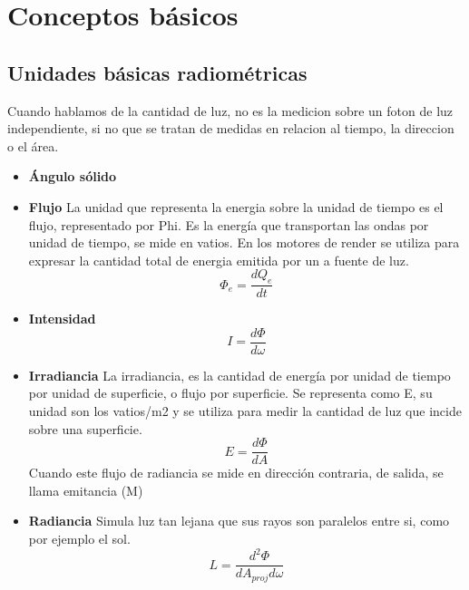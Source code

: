 \chapter{Conceptos b\'asicos}

\section{Unidades b\'asicas radiom\'etricas}
\bgroup
    Cuando hablamos de la cantidad de luz, no es la medicion sobre un foton de luz independiente, si no que se tratan de medidas en relacion
    al tiempo, la direccion o el \'area.

    \begin{itemize}
    \item[] \textbf {{\'Angulo s\'olido}}
    \item[] \textbf {Flujo} La unidad que representa la energia sobre la unidad de tiempo es el flujo, representado por Phi. Es la energía que transportan las ondas
    por unidad de tiempo, se mide en vatios. En los motores de render se utiliza para expresar la cantidad total de energia emitida por un a fuente de luz.
    \begin{equation}
        \Phi_e = \dfrac{d{Q_e}}{dt}
    \end{equation}
    \item[] \textbf {Intensidad}
    \begin{equation}
        I = \dfrac{d\Phi}{d\omega}
    \end{equation} 
    \item[] \textbf {Irradiancia} La irradiancia, es la cantidad de energ\'ia por unidad de tiempo por unidad de superficie, o flujo por superficie. Se representa como
    E, su unidad son los vatios/m2 y se utiliza para medir la cantidad de luz que incide sobre una superficie.
    \begin{equation}
        E = \dfrac{d\Phi}{dA}
    \end{equation}
    Cuando este flujo de radiancia se mide en direcci\'on contraria, de salida, se llama emitancia (M)
    \item[] \textbf {Radiancia} Simula luz tan lejana que sus rayos son paralelos entre si, como por ejemplo el sol.
    \begin{equation}
        L = \dfrac{d^2\Phi}{dA_{proj}d\omega}
    \end{equation}
    \end{itemize}
\egroup


